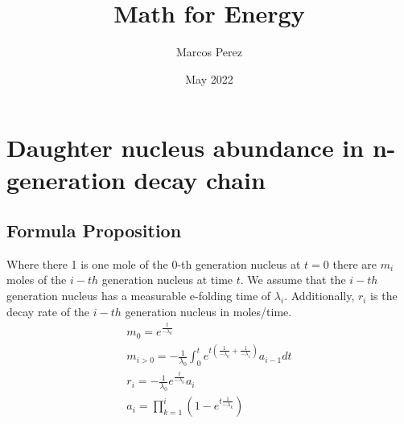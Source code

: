 \documentclass[12pt]{article}
\title{Math for Energy}
\author{Marcos Perez}
\date{May 2022}
\begin{document}
\maketitle
\section{Daughter nucleus abundance in n-generation decay chain}
\subsection{Formula Proposition}
Where there 1 is one mole of the 0-th generation nucleus at $t=0$ there are $m_i$ moles of the $i-th$ generation nucleus at time $t$. We assume that the $i-th$ generation nucleus has a measurable e-folding time of $\lambda_i$. Additionally, $r_i$ is the decay rate of the $i-th$ generation nucleus in moles/time.
\begin{equation}
\begin{split}
m_0 = e^{\frac{t}{-\lambda_0}}\\
m_{i>0} = -\frac{1}{\lambda_0}\int_0^te^{t(\frac{1}{-\lambda_0}+\frac{1}{-\lambda_1})}a_{i-1}dt\\
r_i = -\frac{1}{\lambda_0}e^{\frac{t}{-\lambda_0}}a_i\\
a_i = \prod_{k=1}^{i}(1-e^{t\frac{1}{-\lambda_k}})
\end{split}
\end{equation}
\end{document}
